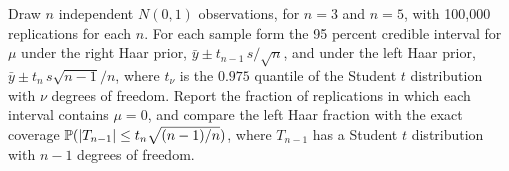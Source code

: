 \begin{exercises}
\item\label{ex:gr:10} Draw $n$ independent $N(0,1)$ observations, for $n=3$ and $n=5$, with 100,000 replications for each $n$. For each sample form the 95 percent credible interval for $\mu$ under the right Haar prior, $\bar y\pm t_{n-1}\,s/\sqrt n$, and under the left Haar prior, $\bar y\pm t_n\,s\sqrt{n-1}/n$, where $t_\nu$ is the $0.975$ quantile of the Student $t$ distribution with $\nu$ degrees of freedom. Report the fraction of replications in which each interval contains $\mu=0$, and compare the left Haar fraction with the exact coverage $\mathbb{P}(|T_{n-1}|\le t_n\sqrt{(n-1)/n})$, where $T_{n-1}$ has a Student $t$ distribution with $n-1$ degrees of freedom.
\end{exercises}
